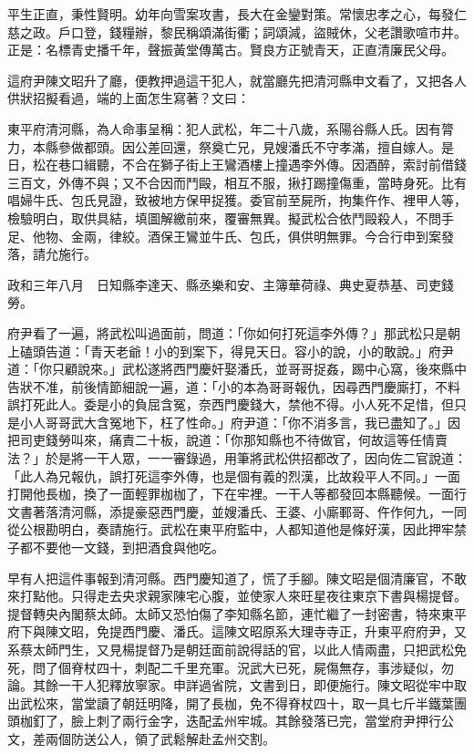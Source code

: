 平生正直，秉性賢明。幼年向雪案攻書，長大在金鑾對策。常懷忠孝之心，每發仁慈之政。戶口登，錢糧辦，黎民稱頌滿街衢；詞頌減，盜賊休，父老讚歌喧市井。正是：名標青史播千年，聲振黃堂傳萬古。賢良方正號青天，正直清廉民父母。

這府尹陳文昭升了廳，便教押過這干犯人，就當廳先把清河縣申文看了，又把各人供狀招擬看過，端的上面怎生寫著？文曰：

東平府清河縣，為人命事呈稱：犯人武松，年二十八歲，系陽谷縣人氏。因有膂力，本縣參做都頭。因公差回還，祭奠亡兄，見嫂潘氏不守孝滿，擅自嫁人。是日，松在巷口緝聽，不合在獅子街上王鸞酒樓上撞遇李外傳。因酒醉，索討前借錢三百文，外傳不與；又不合因而鬥毆，相互不服，揪打踢撞傷重，當時身死。比有唱婦牛氏、包氏見證，致被地方保甲捉獲。委官前至屍所，拘集仵作、裡甲人等，檢驗明白，取供具結，填圖解繳前來，覆審無異。擬武松合依鬥毆殺人，不問手足、他物、金兩，律絞。酒保王鸞並牛氏、包氏，俱供明無罪。今合行申到案發落，請允施行。

政和三年八月　日知縣李達天、縣丞樂和安、主簿華荷祿、典史夏恭基、司吏錢勞。

府尹看了一遍，將武松叫過面前，問道：「你如何打死這李外傳？」那武松只是朝上磕頭告道：「青天老爺！小的到案下，得見天日。容小的說，小的敢說。」府尹道：「你只顧說來。」武松遂將西門慶奸娶潘氏，並哥哥捉姦，踢中心窩，後來縣中告狀不准，前後情節細說一遍，道：「小的本為哥哥報仇，因尋西門慶廝打，不料誤打死此人。委是小的負屈含冤，奈西門慶錢大，禁他不得。小人死不足惜，但只是小人哥哥武大含冤地下，枉了性命。」府尹道：「你不消多言，我已盡知了。」因把司吏錢勞叫來，痛責二十板，說道：「你那知縣也不待做官，何故這等任情賣法？」於是將一干人眾，一一審錄過，用筆將武松供招都改了，因向佐二官說道：「此人為兄報仇，誤打死這李外傳，也是個有義的烈漢，比故殺平人不同。」一面打開他長枷，換了一面輕罪枷枷了，下在牢裡。一干人等都發回本縣聽候。一面行文書著落清河縣，添提豪惡西門慶，並嫂潘氏、王婆、小廝鄆哥、仵作何九，一同從公根勘明白，奏請施行。武松在東平府監中，人都知道他是條好漢，因此押牢禁子都不要他一文錢，到把酒食與他吃。

早有人把這件事報到清河縣。西門慶知道了，慌了手腳。陳文昭是個清廉官，不敢來打點他。只得走去央求親家陳宅心腹，並使家人來旺星夜往東京下書與楊提督。提督轉央內閣蔡太師。太師又恐怕傷了李知縣名節，連忙繼了一封密書，特來東平府下與陳文昭，免提西門慶、潘氏。這陳文昭原系大理寺寺正，升東平府府尹，又系蔡太師門生，又見楊提督乃是朝廷面前說得話的官，以此人情兩盡，只把武松免死，問了個脊杖四十，刺配二千里充軍。況武大已死，屍傷無存，事涉疑似，勿論。其餘一干人犯釋放寧家。申詳過省院，文書到日，即便施行。陳文昭從牢中取出武松來，當堂讀了朝廷明降，開了長枷，免不得脊杖四十，取一具七斤半鐵葉團頭枷釘了，臉上刺了兩行金字，迭配孟州牢城。其餘發落已完，當堂府尹押行公文，差兩個防送公人，領了武鬆解赴孟州交割。

